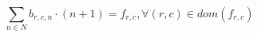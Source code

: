 \documentclass[10pt]{article}
\begin{document}
\[\sum_{n \in N} b_{r,c,n} \cdot (n+1) = f_{r,c}, \forall (r,c) \in dom(f_{r,c})\]
\end{document}
